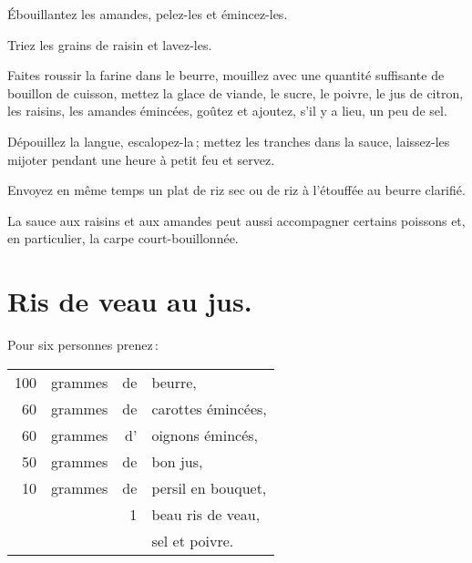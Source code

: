 Ébouillantez les amandes, pelez-les et émincez-les.

Triez les grains de raisin et lavez-les.

Faites roussir la farine dans le beurre, mouillez avec une quantité suffisante
de bouillon de cuisson, mettez la glace de viande, le sucre, le poivre, le jus
de citron, les raisins, les amandes émincées, goûtez et ajoutez, s'il y a lieu,
un peu de sel.

Dépouillez la langue, escalopez-la ; mettez les tranches dans la sauce,
laissez-les mijoter pendant une heure à petit feu et servez.

Envoyez en même temps un plat de riz sec ou de riz à l’étouffée au beurre clarifié.

\sk

La sauce aux raisins et aux amandes peut aussi accompagner certains poissons
et, en particulier, la carpe court-bouillonnée.

\section*{\centering Ris de veau au jus.}
{}

Pour six personnes prenez :

\medskip

\footnotesize
\begin{longtable}{rrrp{18em}}
    100 & grammes & de & beurre,                                                                          \\
     60 & grammes & de & carottes émincées,                                                               \\
     60 & grammes & d’ & oignons émincés,                                                                 \\
     50 & grammes & de & bon jus,                                                                         \\
     10 & grammes & de & persil en bouquet,                                                               \\
        &         &  1 & beau ris de veau,                                                                \\
        &         &    & sel et poivre.                                                                   \\
\end{longtable}
\normalsize

